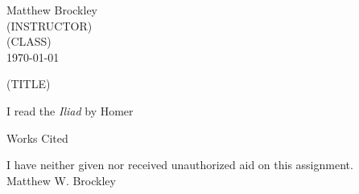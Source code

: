 \documentclass[12pt]{article}
\begin{document}
\begin{flushleft}

Matthew Brockley\\
(INSTRUCTOR)\\
(CLASS)\\
\today \\

\begin{center}
(TITLE)
\end{center}

\setlength{\parindent}{0.5in}


I read the \textit{Iliad} by Homer \autocite{homer2011}

\begin{center}
	Works Cited
\end{center}
\printbibliography[heading=none]


\begin{center}
\singlespacing
I have neither given nor received unauthorized aid on this assignment.\\
Matthew W. Brockley
\end{center}


\end{flushleft}
\end{document}
